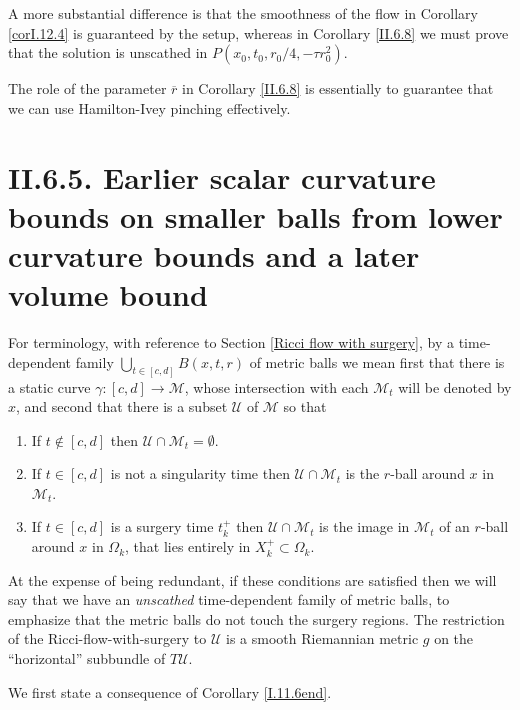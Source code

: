 \documentclass[12pt]{amsart}
\newcommand{\M}{{\mathcal M}}
\numberwithin{equation}{section}
\theoremstyle{plain}
\theoremstyle{definition}
\theoremstyle{remark}
\begin{document}
A more substantial difference is that the smoothness of the flow
in Corollary \ref{corI.12.4}
is guaranteed by the setup, whereas in Corollary \ref{II.6.8} we must
prove that the solution is unscathed in $P(x_0, t_0, r_0/4, - \tau r_0^2)$.

The role of the parameter $\overline{r}$ in Corollary \ref{II.6.8} is
essentially to guarantee that we can use Hamilton-Ivey pinching
effectively.


\section{II.6.5. Earlier scalar curvature bounds on smaller balls from
lower curvature bounds and a later volume bound} \label{II.6.5}

For terminology, with reference to Section \ref{Ricci flow with surgery},
by a time-dependent family $\bigcup_{t \in [c,d]} B(x, t, r)$
of metric balls we mean first that there is a static
curve $\gamma : [c,d] \rightarrow \M$, whose intersection with each
$\M_t$ will be denoted by $x$, and second that there is
a subset ${\mathcal U}$ of $\M$ so that
\begin{enumerate}
\item If $t \notin [c,d]$ then ${\mathcal U} \cap \M_t = \emptyset$.
\item If $t \in [c,d]$ is not
a singularity time then ${\mathcal U} \cap \M_t$ is the $r$-ball around $x$ in
$\M_t$.
\item If $t \in [c,d]$ is a surgery time $t_k^+$ then 
${\mathcal U} \cap \M_t$ is
the image in $\M_t$ of an $r$-ball around $x$ in
$\Omega_k$, that lies entirely in $X_k^+ \subset \Omega_k$.
\end{enumerate}
At the expense of being redundant, if these conditions are
satisfied then we will say that 
we have an {\em unscathed} time-dependent family of metric balls,
to emphasize that the metric balls do not touch the surgery regions.
The restriction of the Ricci-flow-with-surgery to ${\mathcal U}$ 
is a smooth Riemannian metric $g$ on the ``horizontal'' subbundle
of $T{\mathcal U}$.

We first state a consequence of Corollary \ref{I.11.6end}.
\end{document}

